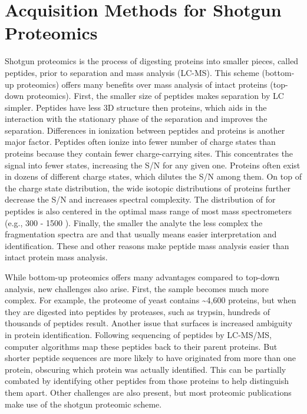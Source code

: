 \section{Acquisition Methods for Shotgun Proteomics}
Shotgun proteomics is the process of digesting proteins into smaller pieces, called peptides, prior to separation and mass analysis (LC-MS).  This scheme (bottom-up proteomics) offers many benefits over mass analysis of intact proteins (top-down proteomics). First, the smaller size of peptides makes separation by LC simpler. Peptides have less 3D structure then proteins, which aids in the interaction with the stationary phase of the separation and improves the separation. Differences in ionization between peptides and proteins is another major factor. Peptides often ionize into fewer number of charge states than proteins because they contain fewer charge-carrying sites. This concentrates the signal into fewer states, increasing the S/N for any given one. Proteins often exist in dozens of different charge states, which dilutes the S/N among them. On top of the charge state distribution, the wide isotopic distributions of proteins further decrease the S/N and increases spectral complexity. The distribution of \mz{} for peptides is also centered in the optimal mass range of most mass spectrometers (e.g., 300 - 1500 \mz{}). Finally, the smaller the analyte the less complex the fragmentation spectra are and that usually means easier interpretation and identification. These and other reasons make peptide mass analysis easier than intact protein mass analysis.

While bottom-up proteomics offers many advantages compared to top-down analysis, new challenges also arise. First, the sample becomes much more complex. For example, the proteome of yeast contains \textasciitilde4,600 proteins, but when they are digested into peptides by proteases, such as trypsin, hundreds of thousands of peptides result. Another issue that surfaces is increased ambiguity in protein identification. Following sequencing of peptides by LC-MS/MS, computer algorithms map these peptides back to their parent proteins. But shorter peptide sequences are more likely to have originated from more than one protein, obscuring which protein was actually identified. This can be partially combated by identifying other peptides from those proteins to help distinguish them apart. Other challenges are also present, but most proteomic publications make use of the shotgun proteomic scheme.

